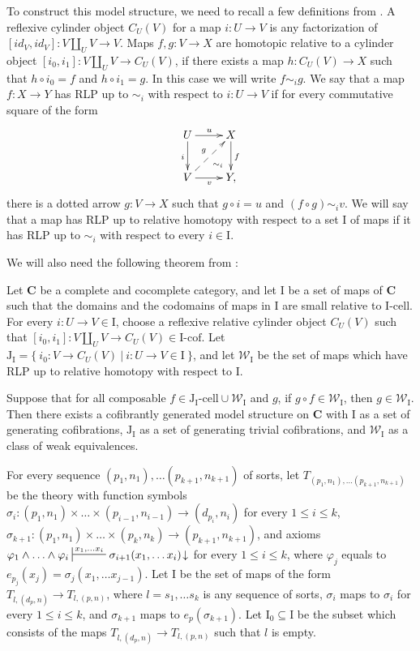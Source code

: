 \documentclass[reqno]{amsart}
\theoremstyle{definition}
\theoremstyle{remark}
\newcommand{\cat}[1]{\mathbf{#1}}
\newcommand{\C}{\cat{C}}
\newcommand{\we}{\mathcal{W}}
\newcommand{\I}{\mathrm{I}}
\newcommand{\J}{\mathrm{J}}
\newcommand{\class}[2]{#1\text{-}\mathrm{#2}}
\newcommand{\Icell}[1][\I]{\class{#1}{cell}}
\newcommand{\Icof}[1][\I]{\class{#1}{cof}}
\newcommand{\Jcell}[1][]{\Icell[\J#1]}
\newcommand{\cyli}{i}
\numberwithin{figure}{section}
\begin{document}
To construct this model structure, we need to recall a few definitions from \cite{f-model-structures}.
A reflexive cylinder object $C_U(V)$ for a map $i : U \to V$ is any factorization of $[id_V,id_V] : V \amalg_U V \to V$.
Maps $f,g : V \to X$ are homotopic relative to a cylinder object $[\cyli_0,\cyli_1] : V \amalg_U V \to C_U(V)$, if there exists a map $h : C_U(V) \to X$
such that $h \circ \cyli_0 = f$ and $h \circ \cyli_1 = g$.
In this case we will write $f \sim_i g$.
We say that a map $f : X \to Y$ has RLP up to $\sim_i$ with respect to $i : U \to V$ if for every commutative square of the form
\[ \xymatrix{ U \ar[r]^u \ar@{}[dr]|(.7){\sim_i} \ar[d]_i & X \ar[d]^f \\
              V \ar[r]_v \ar@{-->}[ur]^g                  & Y,
            } \]
there is a dotted arrow $g : V \to X$ such that $g \circ i = u$ and $(f \circ g) \sim_i v$.
We will say that a map has RLP up to relative homotopy with respect to a set $\I$ of maps if it has RLP up to $\sim_i$ with respect to every $i \in \I$.

We will also need the following theorem from \cite{f-model-structures}:
\begin{thm}
Let $\C$ be a complete and cocomplete category, and let $\I$ be a set of maps of $\C$
such that the domains and the codomains of maps in $\I$ are small relative to $\Icell$.
For every $i : U \to V \in \I$, choose a reflexive relative cylinder object $C_U(V)$
such that $[\cyli_0,\cyli_1] : V \amalg_U V \to C_U(V) \in \Icof$.
Let $\J_\I = \{\ \cyli_0 : V \to C_U(V)\ |\ i : U \to V \in \I \ \}$, and
let $\we_\I$ be the set of maps which have RLP up to relative homotopy with respect to $\I$.

Suppose that for all composable $f \in \Jcell[_\I] \cup \we_\I$ and $g$, if $g \circ f \in \we_\I$, then $g \in \we_\I$.
Then there exists a cofibrantly generated model structure on $\C$ with $\I$ as a set of generating cofibrations,
$\J_\I$ as a set of generating trivial cofibrations, and $\we_\I$ as a class of weak equivalences.
\end{thm}

For every sequence $(p_1,n_1), \ldots (p_{k+1},n_{k+1})$ of sorts, let $T_{(p_1,n_1), \ldots (p_{k+1},n_{k+1})}$ be the theory
with function symbols $\sigma_i : (p_1,n_1) \times \ldots \times (p_{i-1},n_{i-1}) \to (d_{p_i},n_i)$ for every $1 \leq i \leq k$,
$\sigma_{k+1} : (p_1,n_1) \times \ldots \times (p_k,n_k) \to (p_{k+1},n_{k+1})$,
and axioms $\varphi_1 \land \ldots \land \varphi_i \sststile{}{x_1, \ldots x_i} \sigma_{i+1}(x_1, \ldots x_i)\!\downarrow$ for every $1 \leq i \leq k$,
where $\varphi_j$ equals to $e_{p_j}(x_j) = \sigma_j(x_1, \ldots x_{j-1})$.
Let $\I$ be the set of maps of the form $T_{l, (d_p,n)} \to T_{l, (p,n)}$, where $l = s_1, \ldots s_k$ is any sequence of sorts,
$\sigma_i$ maps to $\sigma_i$ for every $1 \leq i \leq k$, and $\sigma_{k+1}$ maps to $e_p(\sigma_{k+1})$.
Let $\I_0 \subseteq \I$ be the subset which consists of the maps $T_{l, (d_p,n)} \to T_{l, (p,n)}$ such that $l$ is empty.
\end{document}
